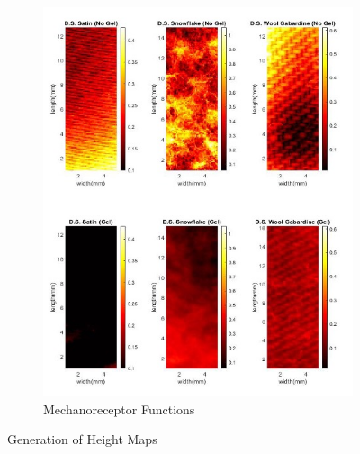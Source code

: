 \documentclass[
11pt,notheorems,hyperref={pdfauthor=whatever}
]{beamer}
\begin{document}
\begin{frame}
\begin{figure}
\begin{subfigure}[b]{0.28\textwidth}
            \includegraphics[scale=0.25]{Neuro_RawHeight.jpg}
            \caption{Mechanoreceptor Functions}
        \end{subfigure}
        \renewcommand{\figurename}{Figure 11}
        \caption{Generation of Height Maps}
    \end{figure}
\end{frame}
\end{document}
